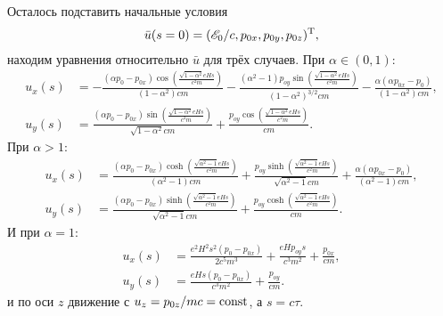 Осталось подставить начальные условия
\begin{equation*}
	\bar{u}(s=0) = (\mathscr{E}_0/c, p_{0x}, p_{0y}, p_{0z})^{\text{T}},
\end{equation*}
находим уравнения относительно $\bar{u}$ для трёх случаев. При $\alpha \in (0, 1)$:
\begin{align*}
	u_x(s) &= -\frac{(\alpha  p_0-p_{0x}) \cos \left(\frac{\sqrt{1-\alpha ^2} e H s}{c^2 m}\right)}{\left(1-\alpha ^2\right) c m}-\frac{\left(\alpha ^2-1\right) p_{oy} \sin \left(\frac{\sqrt{1-\alpha ^2} e H s}{c^2 m}\right)}{\left(1-\alpha ^2\right)^{3/2} c m}-\frac{\alpha  (\alpha  p_{0x}-p_0)}{\left(1-\alpha ^2\right) c m} ,
	\\
	u_y(s) &= \frac{(\alpha  p_0-p_{0x}) \sin \left(\frac{\sqrt{1-\alpha ^2} e H s}{c^2 m}\right)}{\sqrt{1-\alpha ^2} c m}+\frac{p_{oy} \cos \left(\frac{\sqrt{1-\alpha ^2} e H s}{c^2 m}\right)}{c m}.
\end{align*}
При $\alpha > 1$:
\begin{align*}
	u_x(s) &= \frac{(\alpha  p_0-p_{0x}) \cosh \left(\frac{\sqrt{\alpha ^2-1} e H s}{c^2 m}\right)}{\left(\alpha ^2-1\right) c m}+\frac{p_{oy} \sinh \left(\frac{\sqrt{\alpha ^2-1} e H s}{c^2 m}\right)}{\sqrt{\alpha ^2-1} c m}+\frac{\alpha  (\alpha  p_{0x}-p_0)}{\left(\alpha ^2-1\right) c m},
	\\
	u_y(s) &= \frac{(\alpha  p_0-p_{0x}) \sinh \left(\frac{\sqrt{\alpha ^2-1} e H s}{c^2 m}\right)}{\sqrt{\alpha ^2-1} c m}+\frac{p_{oy} \cosh \left(\frac{\sqrt{\alpha ^2-1} e H s}{c^2 m}\right)}{c m}.
\end{align*}
И при $\alpha = 1$:
\begin{align*}
	u_x(s) &= \frac{e^2 H^2 s^2 (p_0-p_{0x})}{2 c^5 m^3}+\frac{e H p_{oy} s}{c^3 m^2}+\frac{p_{0x}}{c m}, \\
	u_y(s) &= \frac{e H s (p_0-p_{0x})}{c^3 m^2}+\frac{p_{oy}}{c m}.
\end{align*}
и по оси $z$ движение с $u_z = p_{0z} / mc = \text{const}$, а $s = c \tau$.
